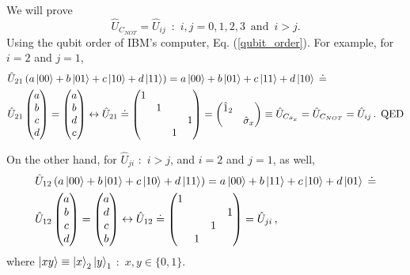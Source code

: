 \documentclass[11pt]{article}
\numberwithin{equation}{section} %
\numberwithin{figure}{section} %
\begin{document}
\begin{appendices}
We will prove
\begin{equation}
 \hat{U}_{C_{NOT}}=\hat{U}_{ij}\,\textrm{ : } \,i,j=0,1,2,3\,\,\,\textrm{and}\,\,\,i>j\textrm{.}
\end{equation} 
Using the qubit order of IBM's computer, Eq. (\ref{qubit_order}). For example, for $i=2$ and $j=1$, 
\begin{equation} \label{U_CNOT_32}
\begin{split}
&	\hat{U}_{21}\left(a\ket{00}+b\ket{01}+c\ket{10}+d\ket{11} \right)=a\ket{00}+b\ket{01}+c\ket{11}+d\ket{10}\,\doteq\\
&	\hat{U}_{21}\begin{pmatrix}a\\ b\\ c\\ d\end{pmatrix} = \begin{pmatrix}a\\ b\\ d\\ c\end{pmatrix}\leftrightarrow \hat{U}_{21}\doteq \begin{pmatrix} 1&&&\\ &1&&\\ &&&1\\ &&1&\end{pmatrix}= \begin{pmatrix}\hat{1}_2&\\&\hat{\sigma}_x\end{pmatrix}\equiv \hat{U}_{C_{\hat{\sigma}_x}}=\hat{U}_{C_{NOT}}=\hat{U}_{ij}\,\textrm{. QED}
\end{split}
\end{equation}

On the other hand, for $\hat{U}_{ji}$ $:$ $i>j$, and $i=2$ and $j=1$, as well,
\begin{equation} \label{U_CNOT_23}
\begin{split}
&	\hat{U}_{12}\left(a\ket{00}+b\ket{01}+c\ket{10}+d\ket{11} \right)=a\ket{00}+b\ket{11}+c\ket{10}+d\ket{01}\,\doteq\\
&	\hat{U}_{12}\begin{pmatrix}a\\ b\\ c\\ d\end{pmatrix} = \begin{pmatrix}a\\ d\\ c\\ b\end{pmatrix}\leftrightarrow \hat{U}_{12}\doteq \begin{pmatrix} 1&&&\\ &&&1\\ &&1&\\ &1&&\end{pmatrix}=\hat{U}_{ji}\,\textrm{,}
\end{split}
\end{equation}
where $\ket{xy}\equiv\ket{x}_2\ket{y}_1$ $:$ $x,y\in\{0,1\}$.





\end{appendices}
\end{document}
